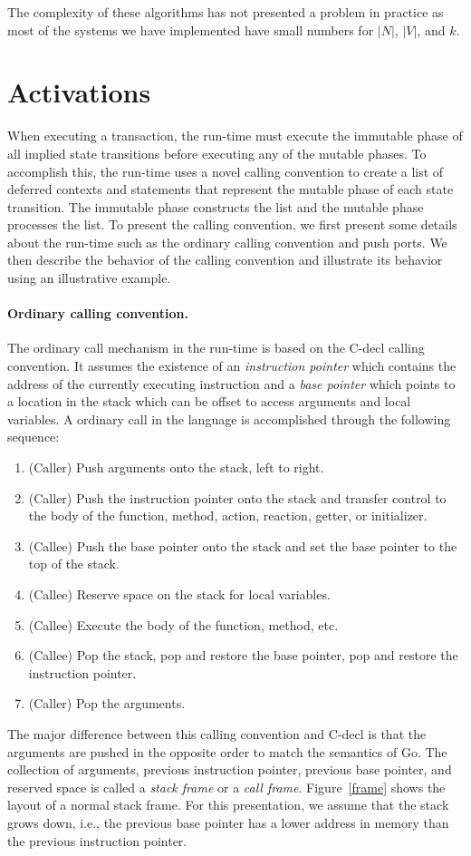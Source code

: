 The complexity of these algorithms has not presented a problem in practice as most of the systems we have implemented have small numbers for $|N|$, $|V|$, and $k$.

\section{Activations}

When executing a transaction, the run-time must execute the immutable phase of all implied state transitions before executing any of the mutable phases.
To accomplish this, the run-time uses a novel calling convention to create a list of deferred contexts and statements that represent the mutable phase of each state transition.
The immutable phase constructs the list and the mutable phase processes the list.
To present the calling convention, we first present some details about the run-time such as the ordinary calling convention and push ports.
We then describe the behavior of the calling convention and illustrate its behavior using an illustrative example.

\paragraph{Ordinary calling convention.}
The ordinary call mechanism in the run-time is based on the C-decl calling convention.
It assumes the existence of an \emph{instruction pointer} which contains the address of the currently executing instruction and a \emph{base pointer} which points to a location in the stack which can be offset to access arguments and local variables.
A ordinary call in the language is accomplished through the following sequence:
\begin{enumerate}
\item (Caller) Push arguments onto the stack, left to right.
\item (Caller) Push the instruction pointer onto the stack and transfer control to the body of the function, method, action, reaction, getter, or initializer.
\item (Callee) Push the base pointer onto the stack and set the base pointer to the top of the stack.
\item (Callee) Reserve space on the stack for local variables.
\item (Callee) Execute the body of the function, method, etc.
\item (Callee) Pop the stack, pop and restore the base pointer, pop and restore the instruction pointer.
\item (Caller) Pop the arguments.
\end{enumerate}
The major difference between this calling convention and C-decl is that the arguments are pushed in the opposite order to match the semantics of Go.
The collection of arguments, previous instruction pointer, previous base pointer, and reserved space is called a \emph{stack frame} or a \emph{call frame}.
Figure~\ref{frame} shows the layout of a normal stack frame.
For this presentation, we assume that the stack grows down, i.e., the previous base pointer has a lower address in memory than the previous instruction pointer.

